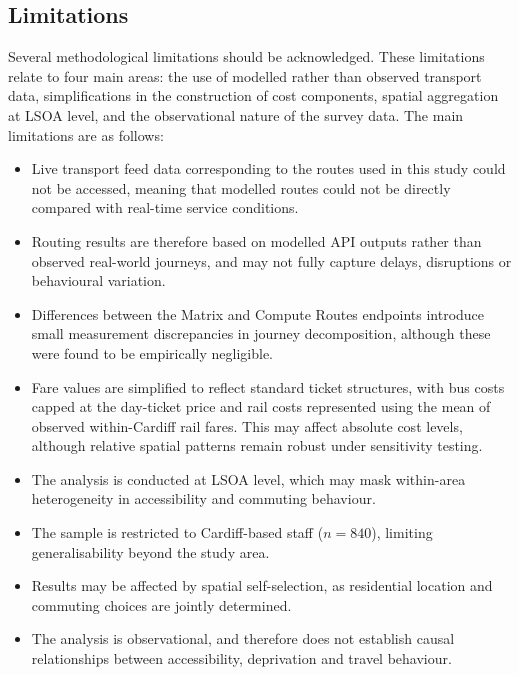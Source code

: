 \documentclass[11pt,a4paper]{article}
\begin{document}
\subsection{Limitations}

Several methodological limitations should be acknowledged. These limitations relate to four main areas: the use of modelled rather than observed transport data, simplifications in the construction of cost components, spatial aggregation at LSOA level, and the observational nature of the survey data. The main limitations are as follows:

\begin{itemize}
    \item Live transport feed data corresponding to the routes used in this study could not be accessed, meaning that modelled routes could not be directly compared with real-time service conditions.

    \item Routing results are therefore based on modelled API outputs rather than observed real-world journeys, and may not fully capture delays, disruptions or behavioural variation.

    \item Differences between the Matrix and Compute Routes endpoints introduce small measurement discrepancies in journey decomposition, although these were found to be empirically negligible.

    \item Fare values are simplified to reflect standard ticket structures, with bus costs capped at the day-ticket price and rail costs represented using the mean of observed within-Cardiff rail fares. This may affect absolute cost levels, although relative spatial patterns remain robust under sensitivity testing.

    \item The analysis is conducted at LSOA level, which may mask within-area heterogeneity in accessibility and commuting behaviour.

    \item The sample is restricted to Cardiff-based staff (\(n = 840\)), limiting generalisability beyond the study area.

    \item Results may be affected by spatial self-selection, as residential location and commuting choices are jointly determined.

    \item The analysis is observational, and therefore does not establish causal relationships between accessibility, deprivation and travel behaviour.
\end{itemize}
\end{document}
